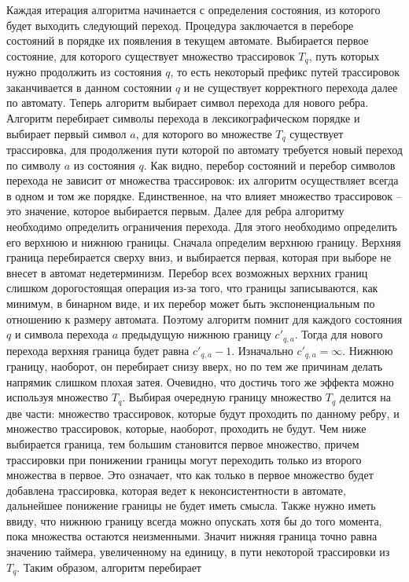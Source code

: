 \documentclass[times,specification,annotation]{itmo-student-thesis}
\begin{document}
Каждая итерация алгоритма начинается с определения состояния, из которого будет выходить следующий переход. Процедура заключается в переборе состояний в порядке их появления в текущем автомате.
Выбирается первое состояние, для которого существует множество трассировок $T_q$, путь которых нужно продолжить из состояния $q$, то есть некоторый префикс путей трассировок
заканчивается в данном состоянии $q$ и не существует корректного перехода
далее по автомату. Теперь алгоритм выбирает символ перехода для нового ребра. Алгоритм перебирает символы перехода в лексикографическом порядке и выбирает первый символ $a$, для которого
во множестве $T_q$ существует трассировка, для продолжения пути которой по автомату требуется новый переход по символу $a$ из состояния $q$. Как видно, перебор состояний и перебор
символов перехода не зависит от множества трассировок: их алгоритм осуществляет всегда в одном и том же порядке. Единственное, на что влияет множество трассировок -- это значение, которое выбирается
первым. Далее для ребра алгоритму необходимо определить ограничения перехода. Для этого необходимо определить его верхнюю и нижнюю границы. Сначала определим верхнюю границу.
Верхняя граница перебирается сверху вниз, и выбирается первая, которая при выборе не внесет в автомат недетерминизм. Перебор всех возможных верхних границ слишком дорогостоящая операция из-за
того, что границы записываются, как минимум, в бинарном виде, и их перебор может быть экспоненциальным по отношению к размеру автомата. Поэтому алгоритм помнит для каждого состояния $q$ и символа
перехода $a$ предыдущую нижнюю границу $c'_{q, a}$. Тогда для нового перехода верхняя граница будет равна $c'_{q, a} - 1$. Изначально $c'_{q, a} = \infty$. Нижнюю границу, наоборот, он
перебирает снизу вверх, но по тем же причинам делать напрямик слишком плохая затея. Очевидно, что достичь того же эффекта можно используя множество $T_q$. Выбирая очередную границу множество $T_q$ делится
на две части: множество трассировок, которые будут проходить по данному ребру, и множество трассировок, которые, наоборот, проходить не будут. Чем ниже выбирается граница, тем большим становится
первое множество, причем трассировки при понижении границы могут переходить только из второго множества в первое. Это означает, что как только в первое множество будет добавлена трассировка,
которая ведет к неконсистентности в автомате, дальнейшее понижение границы не будет иметь смысла. Также нужно иметь ввиду, что нижнюю границу всегда можно опускать хотя бы до того момента, 
пока множества остаются неизменными. Значит нижняя граница точно равна значению таймера, увеличенному на единицу, в пути некоторой трассировки из $T_q$. Таким образом, алгоритм перебирает 
\end{document}

